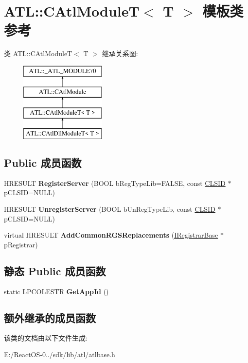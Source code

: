 \hypertarget{class_a_t_l_1_1_c_atl_module_t}{}\section{A\+TL\+:\+:C\+Atl\+ModuleT$<$ T $>$ 模板类 参考}
\label{class_a_t_l_1_1_c_atl_module_t}
类 A\+TL\+:\+:C\+Atl\+ModuleT$<$ T $>$ 继承关系图\+:\begin{figure}[H]
\begin{center}
\leavevmode
\includegraphics[height=4.000000cm]{class_a_t_l_1_1_c_atl_module_t}
\end{center}
\end{figure}
\subsection*{Public 成员函数}
\begin{DoxyCompactItemize}
\item 
\mbox{\label{class_a_t_l_1_1_c_atl_module_t_acc30cd5e25eaa1a477960ae16968d92f}} 
H\+R\+E\+S\+U\+LT {\bfseries Register\+Server} (B\+O\+OL b\+Reg\+Type\+Lib=F\+A\+L\+SE, const \hyperlink{struct___i_i_d}{C\+L\+S\+ID} $\ast$p\+C\+L\+S\+ID=N\+U\+LL)
\item 
\mbox{\label{class_a_t_l_1_1_c_atl_module_t_a119159005a576f5d524be7ec075a9b22}} 
H\+R\+E\+S\+U\+LT {\bfseries Unregister\+Server} (B\+O\+OL b\+Un\+Reg\+Type\+Lib, const \hyperlink{struct___i_i_d}{C\+L\+S\+ID} $\ast$p\+C\+L\+S\+ID=N\+U\+LL)
\item 
\mbox{\label{class_a_t_l_1_1_c_atl_module_t_a6b3e7071b86f50d222f6b55bd5ef2a5f}} 
virtual H\+R\+E\+S\+U\+LT {\bfseries Add\+Common\+R\+G\+S\+Replacements} (\hyperlink{interface_i_registrar_base}{I\+Registrar\+Base} $\ast$p\+Registrar)
\end{DoxyCompactItemize}
\subsection*{静态 Public 成员函数}
\begin{DoxyCompactItemize}
\item 
\mbox{\label{class_a_t_l_1_1_c_atl_module_t_a911acf5bb31a0ad5ec3b4d65e361ab4b}} 
static L\+P\+C\+O\+L\+E\+S\+TR {\bfseries Get\+App\+Id} ()
\end{DoxyCompactItemize}
\subsection*{额外继承的成员函数}


该类的文档由以下文件生成\+:\begin{DoxyCompactItemize}
\item 
E\+:/\+React\+O\+S-\/0../sdk/lib/atl/atlbase.\+h\end{DoxyCompactItemize}
